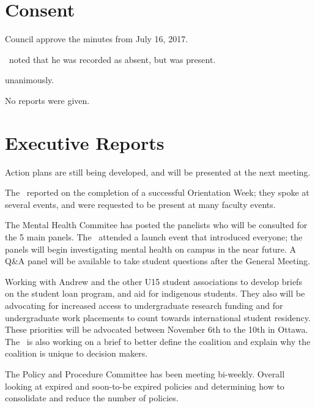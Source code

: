 \section*{Consent}

\begin{motion}
    \birt Council approve the minutes from July 16, 2017.
    \movers{\tristan}{\elizabeth}

    \seneca\ noted that he was recorded as absent, but was present.

    \carries unanimously.
\end{motion}

\begin{information}
    No reports were given.
\end{information}

\section*{Executive Reports}

Action plans are still being developed, and will be presented at the 
next meeting. 


    The \pres\ reported on the completion of a successful Orientation Week;
    they spoke at several events, and were requested to be present at many 
    faculty events.

    The Mental Health Commitee has posted the panelists who will be consulted 
    for the 5 main panels. The \pres\ attended a launch event that introduced 
    everyone; the panels will begin investigating mental health on campus in 
    the near future. A Q\&A panel will be available to take student questions
    after the General Meeting. 

    Working with Andrew and the other U15 student associations to develop 
    briefs on the student loan program, and aid for indigenous students. 
    They also will be advocating for increased access to undergraduate 
    research funding and for undergraduate work placements to count towards 
    international student residency. These priorities will be advocated 
    between November 6th to the 10th in Ottawa. The \vpe\ is also working on a 
    brief to better define the coalition and explain why the coalition is 
    unique to decision makers. 

    The Policy and Procedure Committee has been meeting bi-weekly. Overall 
    looking at expired and soon-to-be expired policies and determining how to 
    consolidate and reduce the number of policies. 
    
